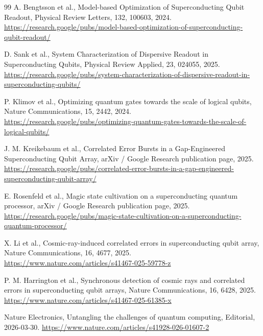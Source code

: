 \documentclass[11pt,a4paper]{article}
\begin{document}
\begin{thebibliography}{99}
A. Bengtsson et al.,
\newblock Model-based Optimization of Superconducting Qubit Readout,
\newblock Physical Review Letters, 132, 100603, 2024.
\newblock \url{https://research.google/pubs/model-based-optimization-of-superconducting-qubit-readout/}

D. Sank et al.,
\newblock System Characterization of Dispersive Readout in Superconducting Qubits,
\newblock Physical Review Applied, 23, 024055, 2025.
\newblock \url{https://research.google/pubs/system-characterization-of-dispersive-readout-in-superconducting-qubits/}

P. Klimov et al.,
\newblock Optimizing quantum gates towards the scale of logical qubits,
\newblock Nature Communications, 15, 2442, 2024.
\newblock \url{https://research.google/pubs/optimizing-quantum-gates-towards-the-scale-of-logical-qubits/}

J. M. Kreikebaum et al.,
\newblock Correlated Error Bursts in a Gap-Engineered Superconducting Qubit Array,
\newblock arXiv / Google Research publication page, 2025.
\newblock \url{https://research.google/pubs/correlated-error-bursts-in-a-gap-engineered-superconducting-qubit-array/}

E. Rosenfeld et al.,
\newblock Magic state cultivation on a superconducting quantum processor,
\newblock arXiv / Google Research publication page, 2025.
\newblock \url{https://research.google/pubs/magic-state-cultivation-on-a-superconducting-quantum-processor/}

X. Li et al.,
\newblock Cosmic-ray-induced correlated errors in superconducting qubit array,
\newblock Nature Communications, 16, 4677, 2025.
\newblock \url{https://www.nature.com/articles/s41467-025-59778-z}

P. M. Harrington et al.,
\newblock Synchronous detection of cosmic rays and correlated errors in superconducting qubit arrays,
\newblock Nature Communications, 16, 6428, 2025.
\newblock \url{https://www.nature.com/articles/s41467-025-61385-x}

Nature Electronics,
\newblock Untangling the challenges of quantum computing,
\newblock Editorial, 2026-03-30.
\newblock \url{https://www.nature.com/articles/s41928-026-01607-2}

\end{thebibliography}
\endgroup
\end{document}
